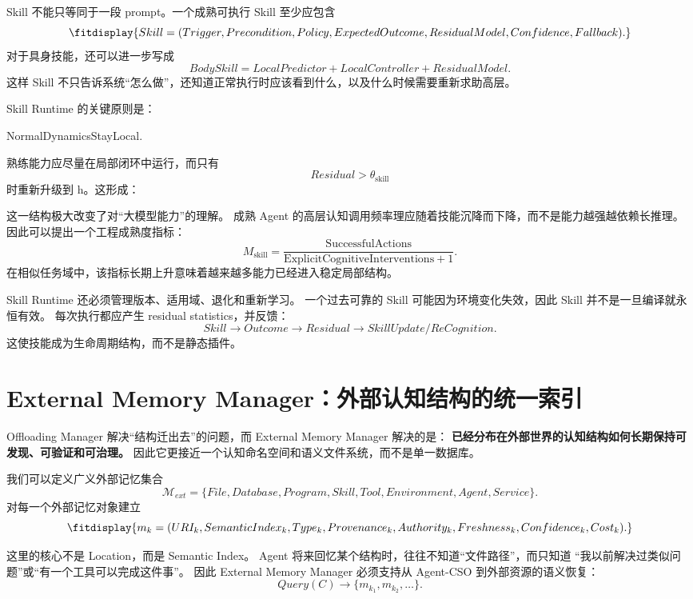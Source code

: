 Skill 不能只等同于一段 prompt。一个成熟可执行 Skill 至少应包含
\[
\fitdisplay{
Skill=
(
Trigger,
Precondition,
Policy,
ExpectedOutcome,
ResidualModel,
Confidence,
Fallback
).
}
\]
对于具身技能，还可以进一步写成
\[
\boxed{
BodySkill
=
LocalPredictor
+
LocalController
+
ResidualModel.
}
\]
这样 Skill 不只告诉系统``怎么做''，还知道正常执行时应该看到什么，以及什么时候需要重新求助高层。

Skill Runtime 的关键原则是：
\begin{statementbox}
NormalDynamicsStayLocal.
\end{statementbox}
熟练能力应尽量在局部闭环中运行，而只有
\[
Residual>\theta_{\mathrm{skill}}
\]
时重新升级到 h。这形成：
\begin{statementbox}
\centering
{}
\end{statementbox}

这一结构极大改变了对``大模型能力''的理解。
成熟 Agent 的高层认知调用频率理应随着技能沉降而下降，而不是能力越强越依赖长推理。
因此可以提出一个工程成熟度指标：
\[
M_{\mathrm{skill}}
=
\frac{\mathrm{SuccessfulActions}}
{\mathrm{ExplicitCognitiveInterventions}+1}.
\]
在相似任务域中，该指标长期上升意味着越来越多能力已经进入稳定局部结构。

Skill Runtime 还必须管理版本、适用域、退化和重新学习。
一个过去可靠的 Skill 可能因为环境变化失效，因此 Skill 并不是一旦编译就永恒有效。
每次执行都应产生 residual statistics，并反馈：
\[
Skill
\rightarrow
Outcome
\rightarrow
Residual
\rightarrow
SkillUpdate/ReCognition.
\]
这使技能成为生命周期结构，而不是静态插件。


\section{External Memory Manager：外部认知结构的统一索引}

Offloading Manager 解决``结构迁出去''的问题，而 External Memory Manager 解决的是：
\textbf{已经分布在外部世界的认知结构如何长期保持可发现、可验证和可治理。}
因此它更接近一个认知命名空间和语义文件系统，而不是单一数据库。

我们可以定义广义外部记忆集合
\[
\mathcal M_{ext}
=
\{
File,
Database,
Program,
Skill,
Tool,
Environment,
Agent,
Service
\}.
\]
对每一个外部记忆对象建立
\[
\fitdisplay{
m_k=
(
URI_k,
SemanticIndex_k,
Type_k,
Provenance_k,
Authority_k,
Freshness_k,
Confidence_k,
Cost_k
).
}
\]

这里的核心不是 Location，而是 Semantic Index。
Agent 将来回忆某个结构时，往往不知道``文件路径''，而只知道
``我以前解决过类似问题''或``有一个工具可以完成这件事''。
因此 External Memory Manager 必须支持从 Agent-CSO 到外部资源的语义恢复：
\[
Query(C)
\rightarrow
\{m_{k_1},m_{k_2},\ldots\}.
\]


